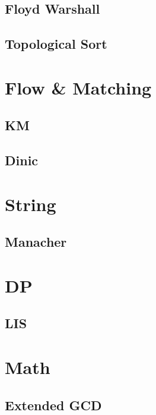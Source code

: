     \subsection{Floyd Warshall}
        
    \subsection{Topological Sort}
        

\section{Flow \& Matching}
    \subsection{KM}
        
    \subsection{Dinic}
        

\section{String}
    \subsection{Manacher}
        

\section{DP}
    \subsection{LIS}
        

\section{Math}
    \subsection{Extended GCD}
        